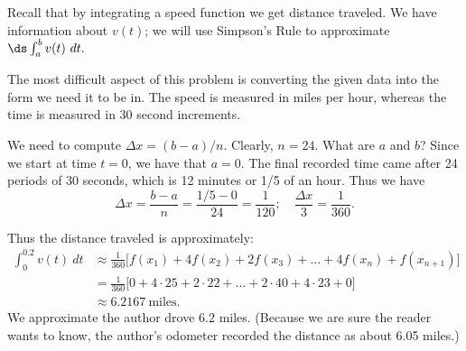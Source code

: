 {Recall that by integrating a speed function we get distance traveled. We have information about $v(t)$; we will use Simpson's Rule to approximate $\ds \int_a^b v(t)\ dt.$ 

The most difficult aspect of this problem is converting the given data into the form we need it to be in. The speed is measured in miles per hour, whereas the time is measured in 30 second increments.

We need to compute $\Delta x = (b-a)/n$. Clearly, $n=24$. What are $a$ and $b$? Since we start at time $t=0$, we have that $a=0$. The final recorded time came after 24 periods of 30 seconds, which is 12 minutes or 1/5 of an hour. Thus we have
\[\Delta x = \frac{b-a}{n} = \frac{1/5-0}{24} = \frac1{120}; \quad \frac{\Delta x}{3} = \frac{1}{360}.\]

Thus the distance traveled is approximately:
\begin{align*}
\int_0^{0.2}v(t)\ dt &\approx \frac{1}{360}\Big[f(x_1)+4f(x_2) + 2f(x_3) + \dots + 4f(x_n)+f(x_{n+1})\Big]\\
					&= \frac{1}{360}\Big[0+4\cdot25+2\cdot 22 + \dots + 2\cdot40+4\cdot 23 + 0\Big]\\
					&\approx 6.2167 \ \text{miles.}
\end{align*}
We approximate the author drove 6.2 miles. (Because we are sure the reader wants to know, the author's odometer recorded the distance as about 6.05 miles.)}

%
%

